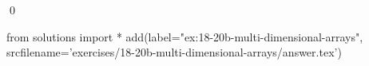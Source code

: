 
\begin{ex} 
  \label{ex:18-20b-multi-dimensional-arrays}
  
  \qed
\end{ex} 
\begin{python0}
from solutions import *
add(label="ex:18-20b-multi-dimensional-arrays",
    srcfilename='exercises/18-20b-multi-dimensional-arrays/answer.tex') 
\end{python0}
